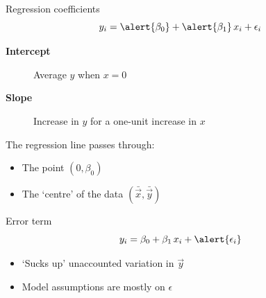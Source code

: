 \begin{frame}[t]{Regression coefficients}
    \[
        y_{i} = \alert{\beta_{0}} + \alert{\beta_{1}}\,x_{i} + \epsilon_{i}
    \]
    \vfill
    \begin{description}
        \item[\textbf{Intercept}] Average $y$ when $x = 0$
        \item[\textbf{Slope}] Increase in $y$ for a one\hyp{}unit increase in $x$
    \end{description}
    \vfill
    The regression line passes through:\vspace{-1ex}
    \begin{itemize}
        \item The point $(0, \beta_{0})$
        \item The `centre' of the data $(\bar{\vec{x}}, \bar{\vec{y}})$
    \end{itemize}
\end{frame}

\begin{frame}[t]{Error term}
    \[
        y_{i} = \beta_{0} + \beta_{1}\,x_{i} + \alert{\epsilon_{i}}
    \]
    \vfill
    \begin{itemize}
        \item `Sucks up' unaccounted variation in $\vec{y}$
        \item Model assumptions are mostly on $\epsilon$
    \end{itemize}
\end{frame}

